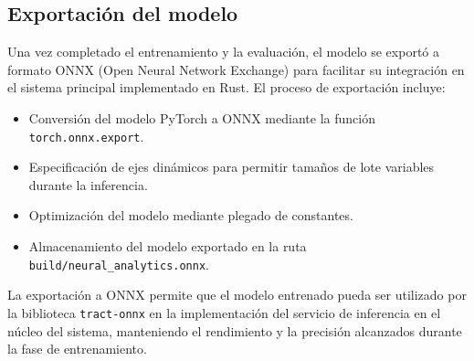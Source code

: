 \subsection{Exportación del modelo}

Una vez completado el entrenamiento y la evaluación, el modelo se exportó a formato ONNX (Open Neural Network Exchange) para facilitar su integración en el sistema principal implementado en Rust. El proceso de exportación incluye:

\begin{itemize}
    \item Conversión del modelo PyTorch a ONNX mediante la función \texttt{torch.onnx.export}.
    \item Especificación de ejes dinámicos para permitir tamaños de lote variables durante la inferencia.
    \item Optimización del modelo mediante plegado de constantes.
    \item Almacenamiento del modelo exportado en la ruta \texttt{build/neural\_analytics.onnx}.
\end{itemize}

La exportación a ONNX permite que el modelo entrenado pueda ser utilizado por la biblioteca \texttt{tract-onnx} en la implementación del servicio de inferencia en el núcleo del sistema, manteniendo el rendimiento y la precisión alcanzados durante la fase de entrenamiento.